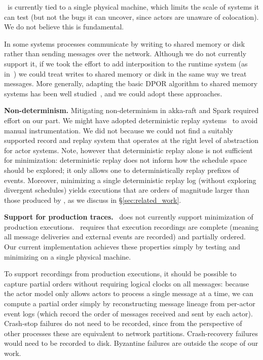  \sys~is currently tied to a
single physical machine, which limits the scale of systems it can test (but
not the bugs it can uncover, since actors are unaware of colocation). We do not
believe this is fundamental.

 In some systems processes communicate
by writing to
shared memory or disk rather than sending messages over the network.
Although we do not currently support it, if we took the effort to add interposition to the
runtime system (as in~\cite{tallam2007enabling}) we could treat writes to shared memory or
disk in the same way we treat messages. More generally, adapting the
basic DPOR algorithm to shared memory systems has been well
studied~\cite{yabandeh2009dpor,flanagan2005dynamic}, and we could adopt these approaches.

\noindent\textbf{Non-determinism.} Mitigating non-determinism in akka-raft and
Spark required effort on our part. We might have adopted deterministic replay
systems~\cite{Dunlap:2002:REI:844128.844148,Geels:2006:RDD:1267359.1267386,lin2013defined,Zamfir:2010:EST:1755913.1755946}
to avoid manual instrumentation. We did not because we could not
find a suitably supported record and replay system that operates at the right
level of abstraction for actor systems.
Note, however that
deterministic replay alone is not sufficient for minimization:
deterministic replay does not inform how the schedule space should be
explored; it only allows one to deterministically replay prefixes of events.
Moreover, minimizing a single deterministic replay log (without exploring divergent
schedules) yields executions that are orders of magnitude larger
than those produced by \sys, as we discuss in
\S\ref{sec:related_work}.

\noindent\textbf{Support for production traces.} \sys~does not currently
support minimization of production executions.
\sys~requires that execution recordings are complete (meaning all message
deliveries and external events are recorded) and partially ordered. Our
current implementation
achieves these properties simply by testing and minimizing on a single
physical machine.

To support recordings from production executions, it should be possible to
capture partial orders without requiring logical clocks on all messages:
because the actor model only allows actors to process a
single message at a time, we can compute a partial order simply by
reconstructing message lineage from per-actor event logs (which record the order
of messages received and sent by each actor).
Crash-stop
failures do not need to be recorded, since from the perspective of other
processes these are equivalent to network partitions. Crash-recovery failures
would need to be recorded to disk. Byzantine failures are outside the scope of
our work.

